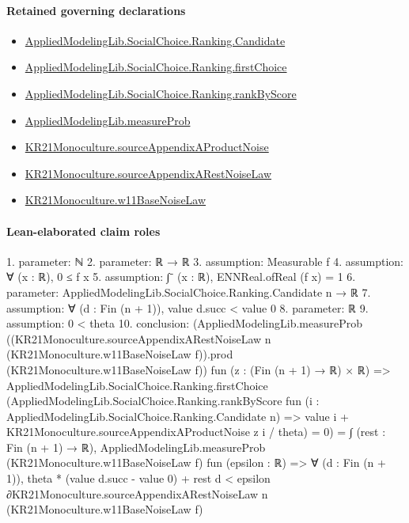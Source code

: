 \documentclass[10pt]{article}
\begin{document}
\paragraph{Retained governing declarations}
\begin{itemize}\raggedright
\item \hyperlink{library-prerequisite-8c0e6c25845ae78a}{Applied\allowbreak{}Modeling\allowbreak{}Lib.\allowbreak{}Social\allowbreak{}Choice.\allowbreak{}Ranking.\allowbreak{}Candidate}
\item \hyperlink{governing-declaration-08e457479ee6cf15}{Applied\allowbreak{}Modeling\allowbreak{}Lib.\allowbreak{}Social\allowbreak{}Choice.\allowbreak{}Ranking.\allowbreak{}first\allowbreak{}Choice}
\item \hyperlink{governing-declaration-c2e98278351275b0}{Applied\allowbreak{}Modeling\allowbreak{}Lib.\allowbreak{}Social\allowbreak{}Choice.\allowbreak{}Ranking.\allowbreak{}rank\allowbreak{}By\allowbreak{}Score}
\item \hyperlink{governing-declaration-80e84a51ccd3e1cd}{Applied\allowbreak{}Modeling\allowbreak{}Lib.\allowbreak{}measure\allowbreak{}Prob}
\item \hyperlink{governing-declaration-407d72bafe4fca62}{KR21\allowbreak{}Monoculture.\allowbreak{}source\allowbreak{}Appendix\allowbreak{}A\allowbreak{}Product\allowbreak{}Noise}
\item \hyperlink{governing-declaration-4dcd160179c4c417}{KR21\allowbreak{}Monoculture.\allowbreak{}source\allowbreak{}Appendix\allowbreak{}A\allowbreak{}Rest\allowbreak{}Noise\allowbreak{}Law}
\item \hyperlink{governing-declaration-8ad91ddc79a1a3cc}{KR21\allowbreak{}Monoculture.\allowbreak{}w11\allowbreak{}Base\allowbreak{}Noise\allowbreak{}Law}
\end{itemize}
\paragraph{Lean-elaborated claim roles}\begin{ReviewVerbatim}
1. parameter: ℕ
2. parameter: ℝ → ℝ
3. assumption: Measurable f
4. assumption: ∀ (x : ℝ), 0 ≤ f x
5. assumption: ∫⁻ (x : ℝ), ENNReal.ofReal (f x) = 1
6. parameter: AppliedModelingLib.SocialChoice.Ranking.Candidate n → ℝ
7. assumption: ∀ (d : Fin (n + 1)), value d.succ < value 0
8. parameter: ℝ
9. assumption: 0 < theta
10. conclusion: (AppliedModelingLib.measureProb
    ((KR21Monoculture.sourceAppendixARestNoiseLaw n (KR21Monoculture.w11BaseNoiseLaw f)).prod
      (KR21Monoculture.w11BaseNoiseLaw f))
    fun (z : (Fin (n + 1) → ℝ) × ℝ) =>
    AppliedModelingLib.SocialChoice.Ranking.firstChoice
        (AppliedModelingLib.SocialChoice.Ranking.rankByScore
          fun (i : AppliedModelingLib.SocialChoice.Ranking.Candidate n) =>
          value i + KR21Monoculture.sourceAppendixAProductNoise z i / theta) =
      0) =
  ∫ (rest : Fin (n + 1) → ℝ),
    AppliedModelingLib.measureProb (KR21Monoculture.w11BaseNoiseLaw f) fun (epsilon : ℝ) =>
      ∀ (d : Fin (n + 1)),
        theta * (value d.succ - value 0) + rest d <
          epsilon ∂KR21Monoculture.sourceAppendixARestNoiseLaw n (KR21Monoculture.w11BaseNoiseLaw f)
\end{ReviewVerbatim}
\end{document}
